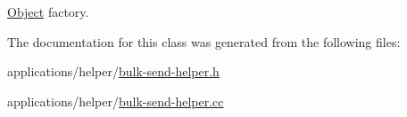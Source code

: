 \hyperlink{classns3_1_1Object}{Object} factory. 



The documentation for this class was generated from the following files\+:\begin{DoxyCompactItemize}
\item 
applications/helper/\hyperlink{bulk-send-helper_8h}{bulk-\/send-\/helper.\+h}\item 
applications/helper/\hyperlink{bulk-send-helper_8cc}{bulk-\/send-\/helper.\+cc}\end{DoxyCompactItemize}
